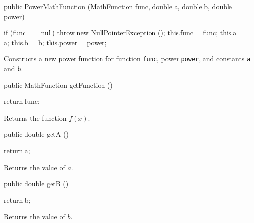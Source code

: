 \begin{code}

   public PowerMathFunction (MathFunction func, double a, double b, double power)\begin{hide} {
      if (func == null)
         throw new NullPointerException ();
      this.func = func;
      this.a = a;
      this.b = b;
      this.power = power;
   }\end{hide}
\end{code}
\begin{tabb}   Constructs a new power function for function \texttt{func}, power
 \texttt{power}, and constants \texttt{a} and \texttt{b}.
\end{tabb}
\begin{htmlonly}
\end{htmlonly}
\begin{code}

   public MathFunction getFunction ()\begin{hide} {
      return func;
   }\end{hide}
\end{code}
\begin{tabb}   Returns the function $f(x)$.
\end{tabb}
\begin{htmlonly}
\end{htmlonly}
\begin{code}

   public double getA ()\begin{hide} {
      return a;
   }\end{hide}
\end{code}
\begin{tabb}   Returns the value of $a$.
\end{tabb}
\begin{htmlonly}
\end{htmlonly}
\begin{code}

   public double getB ()\begin{hide} {
      return b;
   }\end{hide}
\end{code}
\begin{tabb}   Returns the value of $b$.
\end{tabb}
\begin{htmlonly}
\end{htmlonly}
